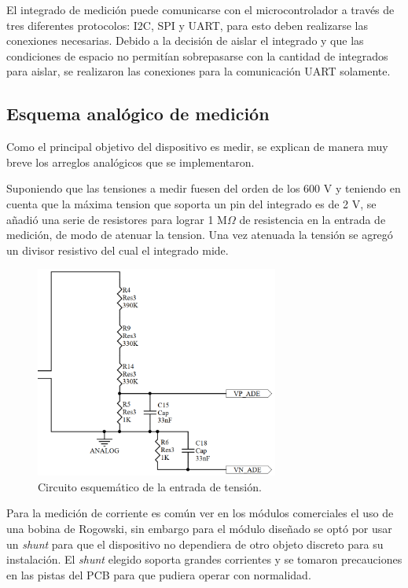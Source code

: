 El integrado de medición puede comunicarse con el microcontrolador a través de tres diferentes protocolos: I2C, SPI y UART, para esto deben realizarse las conexiones necesarias. Debido a la decisión de aislar el integrado y que las condiciones de espacio no permitían sobrepasarse con la cantidad de integrados para aislar, se realizaron las conexiones para la comunicación UART solamente.

\subsection{Esquema analógico de medición }
Como el principal objetivo del dispositivo es medir, se explican de manera muy breve los arreglos analógicos que se implementaron.

Suponiendo que las tensiones a medir fuesen del orden de los 600 V y teniendo en cuenta que la máxima tension que soporta un pin del integrado es de 2 V, se añadió una serie de resistores para lograr 1 M$\Omega$ de resistencia en la entrada de medición, de modo de atenuar la tension. Una vez atenuada la tensión se agregó un divisor resistivo del cual el integrado mide.

\begin{figure}[!htb]
	\centering
	\includegraphics[width=80mm,keepaspectratio]{Figures/medicionvoltaje.png}
	\caption{Circuito esquemático de la entrada de tensión.}
	\label{fig:medvolt}
\end{figure}

Para la medición de corriente es común ver en los módulos comerciales el uso de una bobina de Rogowski, sin embargo para el módulo diseñado se optó por usar un \textit{shunt} para que el dispositivo no dependiera de otro objeto discreto para su instalación. El \textit{shunt} elegido soporta grandes corrientes y se tomaron precauciones en las pistas del PCB para que pudiera operar con normalidad.

